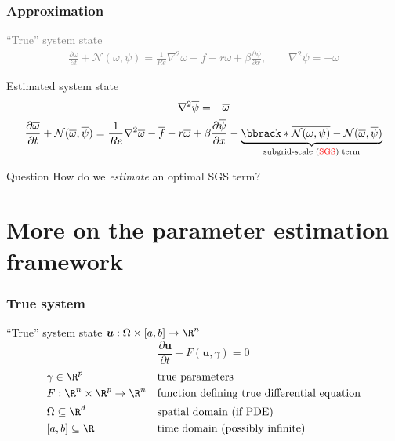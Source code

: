 \documentclass{beamer}
\newcommand{\bu}{\boldsymbol u}
\newcommand{\ol}{\overline}
\begin{document}
\begin{frame}
  \frametitle{Approximation}

  \textcolor{gray}{
    ``True'' system state
    \begin{gather*}
      \frac{\partial \omega}{\partial t} + \mathcal N(\omega, \psi)
      = \frac1{Re} \nabla^2 \omega - f - r \omega
      + \beta \frac{\partial \psi}{\partial x}, \qquad \nabla^2 \psi = - \omega
    \end{gather*}
  }

  Estimated system state
  \begin{equation*}
    \begin{gathered}
      \nabla^2 \ol \psi = - \ol \omega \\
      \frac{\partial \ol \omega}{\partial t} + \mathcal N(\ol \omega, \ol \psi)
      = \frac1{Re} \nabla^2 \ol \omega - \ol f - r \ol \omega
      + \beta \frac{\partial \ol \psi}{\partial x}
      - \underbrace{
        \bbrack*{\ol{\mathcal N(\omega, \psi)}
        - \mathcal N(\ol \omega, \ol \psi)}
      }_{\text{subgrid-scale (} \textcolor{red}{\text{SGS}} \text{) term}}
    \end{gathered}
  \end{equation*}
  \pause

  \begin{block}{Question}
    How do we \textit{estimate} an optimal SGS term?
  \end{block}
\end{frame}

\section{More on the parameter estimation framework}

\begin{frame}
  \frametitle{True system}
  ``True'' system state $\bu: \Omega \times [a, b] \rightarrow \R^n$
  \begin{equation*}
    \frac{\partial \bu}{\partial t} + F(\bu, \gamma) = 0
  \end{equation*}
  \begin{align*}
    &\gamma \in \R^p &&\text{true parameters} \\
    &F: \R^n \times \R^p \rightarrow \R^n &&\text{function defining true
    differential equation} \\
    &\Omega \subseteq \R^d &&\text{spatial domain (if PDE)} \\
    &[a, b] \subseteq \R &&\text{time domain (possibly infinite)}
  \end{align*}
\end{frame}
\end{document}
